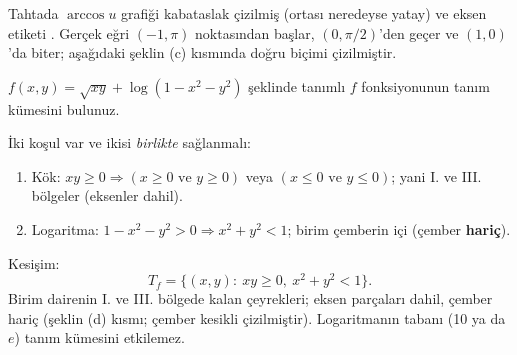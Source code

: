 \begin{bilgi}
Tahtada $\arccos u$ grafiği kabataslak çizilmiş (ortası neredeyse yatay) ve eksen etiketi
. Gerçek eğri $(-1,\pi)$ noktasından başlar,
$(0,\pi/2)$'den geçer ve $(1,0)$'da biter; aşağıdaki şeklin (c) kısmında doğru biçimi çizilmiştir.
\end{bilgi}

\begin{soru}
$f(x,y)=\sqrt{xy}+\log(1-x^2-y^2)$ şeklinde tanımlı $f$ fonksiyonunun tanım kümesini bulunuz.
\end{soru}
\begin{cevap}
İki koşul var ve ikisi \emph{birlikte} sağlanmalı:
\begin{enumerate}
  \item Kök: $xy\ge 0 \Rightarrow (x\ge 0 \text{ ve } y\ge 0)$ veya $(x\le 0\text{ ve }y\le 0)$; yani I. ve III. bölgeler
        (eksenler dahil).
  \item Logaritma: $1-x^2-y^2>0\Rightarrow x^2+y^2<1$; birim çemberin içi (çember \textbf{hariç}).
\end{enumerate}
Kesişim:
\[
T_f=\{(x,y):\ xy\ge 0,\ x^2+y^2<1\}.
\]
Birim dairenin I. ve III. bölgede kalan çeyrekleri; eksen parçaları dahil, çember hariç (şeklin (d) kısmı; çember
kesikli çizilmiştir). Logaritmanın tabanı (10 ya da $e$) tanım kümesini etkilemez.
\end{cevap}

